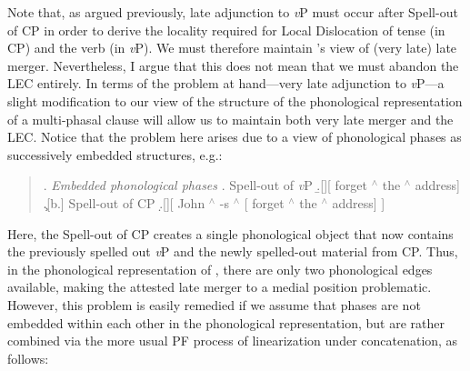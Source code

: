 Note that, as argued previously, late adjunction to {\it v}P must occur after Spell-out of CP in order to derive the locality required for Local Dislocation of tense (in CP) and the verb (in {\it v}P). We must therefore maintain \citeauthor{stepanov2000}'s view of (very late) late merger. Nevertheless, I argue that this does not mean that we must abandon the LEC entirely. In terms of the problem at hand---very late adjunction to {\it v}P---a slight modification to our view of the structure of the phonological representation of a multi-phasal clause will allow us to maintain both very late merger and the LEC. Notice that the problem here arises due to a view of phonological phases as successively embedded structures, e.g.:

\singlespacing
\begin{quote}
\ex. {\it Embedded phonological phases}
\a. Spell-out of {\it v}P
\b.[][ forget $^{\wedge}$ the $^{\wedge}$ address]\\
\c.[b.] Spell-out of CP
\d.[][ John $^{\wedge}$ -s $^{\wedge}$ [ forget $^{\wedge}$ the $^{\wedge}$ address] ]\\

\end{quote}
\onehalfspacing
Here, the Spell-out of CP creates a single phonological object that now contains the previously spelled out {\it v}P and the newly spelled-out material from CP. Thus, in the phonological representation of \Last[b], there are only two phonological edges available, making the attested late merger to a medial position problematic. However, this problem is easily remedied if we assume that phases are not embedded within each other in the phonological representation, but are rather combined via the more usual PF process of linearization under concatenation, as follows:


